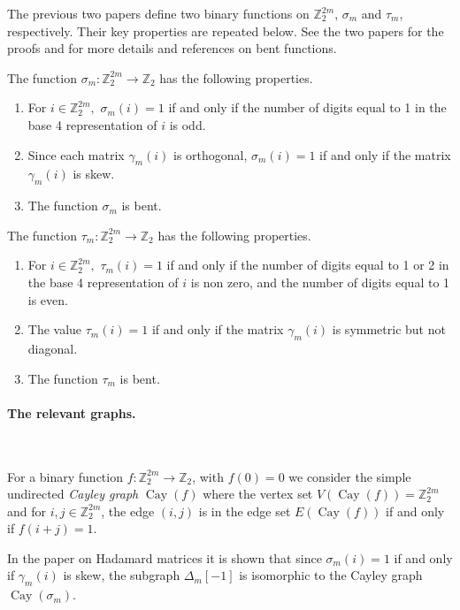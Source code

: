 \documentclass[12pt,a4paper]{article}
\newcommand{\mb}[1]{\mathbb{#1}}
\newcommand{\Cay}{\operatorname{Cay}}
\newcommand{\Z}{\mb{Z}}
\newcommand{\To}{\rightarrow}
\begin{document}
The previous two papers \cite{Leo14Constructions,Leo15Twin} 
define two binary functions  on $\Z_2^{2 m}$, $\sigma_m$ and $\tau_m$, respectively.
Their key properties are repeated below.
See the two papers for the proofs and for more details and references on bent functions.

The function $\sigma_m : \Z_2^{2 m} \To \Z_2$ has the following properties.
\begin{enumerate}
 \item 
For $i \in \Z_2^{2m},$ $\sigma_m(i) = 1$ if and only if the number of
digits equal to 1 in  the base 4 representation of $i$ is odd.
 \item 
Since each matrix $\gamma_m(i)$ is orthogonal, $\sigma_m(i) = 1$ if and only if the matrix $\gamma_m(i)$ is skew.
 \item 
The function $\sigma_m$ is bent.
\end{enumerate}

The function $\tau_m : \Z_2^{2 m} \To \Z_2$ has the following properties.
\begin{enumerate}
 \item 
For $i \in \Z_2^{2m},$ $\tau_m(i) = 1$ if and only if the number of digits equal to 1 or 2 in the base 4
representation of $i$ is non zero, and the number of digits equal to 1 is even.
 \item 
The value $\tau_m(i) = 1$ if and only if the matrix $\gamma_m(i)$ is symmetric but not diagonal.
 \item 
The function $\tau_m$ is bent.
\end{enumerate}

\paragraph*{The relevant graphs.}
\label{sec-Graphs}

~

For a binary function $f : \Z_2^{2 m} \To \Z_2$, with $f(0)=0$ we consider the simple undirected \emph{Cayley graph} $\Cay(f)$  \cite[3.1]{BerC99}
where the vertex set $V(\Cay(f)) = \Z_2^{2 m}$ and for $i,j \in \Z_2^{2 m}$, the edge $(i,j)$ is in the edge set $E(\Cay(f))$ if and only if $f(i+j)=1$.

In the paper on Hada\-mard matrices \cite{Leo14Constructions} it is shown that
since $\sigma_m(i)=1$ if and only if $\gamma_m(i)$ is skew,
the subgraph $\varDelta_m[-1]$ is isomorphic to the Cayley graph $\Cay(\sigma_m)$.
\end{document}
